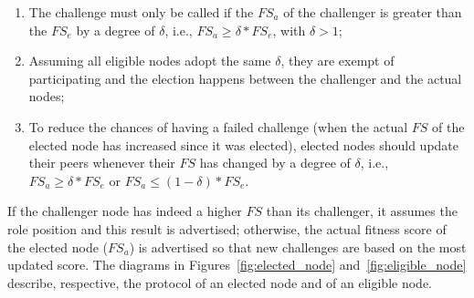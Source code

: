 \begin{enumerate}

\item The challenge must only be called if the $FS_a$ of the challenger is greater than the $FS_e$ by a degree of $\delta$, i.e., $FS_a \ge \delta * FS_e$, with $\delta > 1$;

\item Assuming all eligible nodes adopt the same $\delta$, they are exempt of participating and the election happens between the challenger and the actual nodes;

\item To reduce the chances of having a failed challenge (when the actual $FS$ of the elected node has increased since it was elected), elected nodes should update their peers whenever their $FS$ has changed by a degree of $\delta$, i.e., $FS_a \ge \delta * FS_e$ or $FS_a \le (1 - \delta) * FS_e$.

\end{enumerate}

If the challenger node has indeed a higher $FS$ than its challenger, it assumes the role position and this result is advertised; otherwise, the actual fitness score of the elected node ($FS_a$) is advertised so that new challenges are based on the most updated score. The diagrams in Figures~\ref{fig:elected_node} and~\ref{fig:eligible_node} describe, respective, the protocol of an elected node and of an eligible node.
